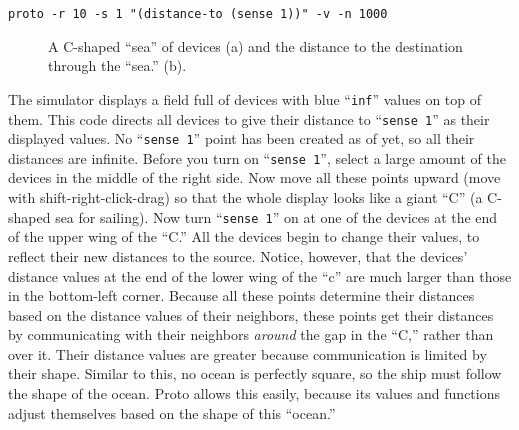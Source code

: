 \documentclass{article}
\newcommand\code[1]{\begin{center}\var{#1}\end{center}}
\newcommand\var[1]{{\tt #1}}
\newcommand\qvar[1]{``{\tt #1}''}
\begin{document}
\code{proto -r 10 -s 1 "(distance-to (sense 1))" -v -n 1000}

\begin{figure}[ht]
\centering
{}
\caption{A C-shaped ``sea'' of devices (a) and the distance to the destination through the ``sea.'' (b).}
\end{figure}

The simulator displays a field full of devices with blue \qvar{inf}
values on top of them.  This code directs all devices to give their
distance to \qvar{sense 1} as their displayed values.  No \qvar{sense
  1} point has been created as of yet, so all their distances are
infinite.  Before you turn on \qvar{sense 1}, select a large amount of
the devices in the middle of the right side. Now move all these points
upward (move with shift-right-click-drag) so that the whole display
looks like a giant ``C'' (a C-shaped sea for sailing).  Now turn
\qvar{sense 1} on at one of the devices at the end of the upper wing
of the ``C.''  All the devices begin to change their values, to
reflect their new distances to the source.  Notice, however, that the
devices' distance values at the end of the lower wing of the ``c'' are
much larger than those in the bottom-left corner.  Because all these
points determine their distances based on the distance values of their
neighbors, these points get their distances by communicating with
their neighbors {\em around} the gap in the ``C,'' rather than over it.
Their distance values are greater because communication is limited by
their shape.  Similar to this, no ocean is perfectly square, so the
ship must follow the shape of the ocean.  Proto allows this easily,
because its values and functions adjust themselves based on the shape
of this ``ocean.''
\end{document}
